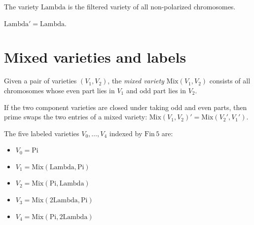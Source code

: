 \begin{definition}
  \label{def:Variety.Lambda}
  \leanok
  The variety $\mathrm{Lambda}$ is the filtered variety of all non-polarized chromosomes.
\end{definition}

\begin{lemma}
  \label{lem:prime_Lambda}
  \leanok
  $\mathrm{Lambda}' = \mathrm{Lambda}$.
\end{lemma}

\section{Mixed varieties and labels}

\begin{definition}
  \label{def:Variety.Mix}
  \leanok
  Given a pair of varieties $(V_1, V_2)$, the \emph{mixed variety} $\mathrm{Mix}(V_1, V_2)$
  consists of all chromosomes whose even part lies in $V_1$ and odd part lies in $V_2$.
\end{definition}

\begin{lemma}
  \label{lem:Variety.prime_Mix_eq}
  \leanok
  If the two component varieties are closed under taking odd and even parts,
  then prime swaps the two entries of a mixed variety:
  $\mathrm{Mix}(V_1,V_2)'=\mathrm{Mix}(V_2',V_1')$.
\end{lemma}

\begin{definition}
  \label{def:Variety.Label}
  \leanok
  The five labeled varieties $V_0, \ldots, V_4$ indexed by $\mathrm{Fin}\,5$ are:
  \begin{itemize}
    \item $V_0 = \mathrm{Pi}$
    \item $V_1 = \mathrm{Mix}(\mathrm{Lambda}, \mathrm{Pi})$
    \item $V_2 = \mathrm{Mix}(\mathrm{Pi}, \mathrm{Lambda})$
    \item $V_3 = \mathrm{Mix}(2\mathrm{Lambda}, \mathrm{Pi})$
    \item $V_4 = \mathrm{Mix}(\mathrm{Pi}, 2\mathrm{Lambda})$
  \end{itemize}
\end{definition}

